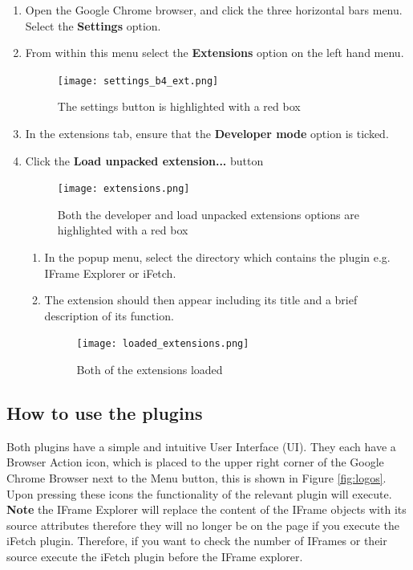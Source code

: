\documentclass[12pt]{article}
\begin{document}
\begin{enumerate}
    \item Open the Google Chrome browser, and click the three horizontal bars menu. Select the \textbf{Settings} option. 
    \item From within this menu select the \textbf{Extensions} option on the left hand menu.
    
    \begin{figure}[H]
        \centering
        \texttt{[image: settings\_b4\_ext.png]}
        \caption{The settings button is highlighted with a red box}
        \label{fig:settings_before_ext}
    \end{figure}

    
    \item In the extensions tab, ensure that the \textbf{Developer mode} option is ticked. 
    \item Click the \textbf{Load unpacked extension...} button
    
    \begin{figure}[H]
        \centering
        \texttt{[image: extensions.png]}
        \caption{Both the developer and load unpacked extensions options are highlighted with a red box}
        \label{fig:extensions}
    \end{figure}
    
    \begin{enumerate}
        \item In the popup menu, select the directory which contains the plugin e.g. IFrame Explorer or iFetch. 
        \item The extension should then appear including its title and a brief description of its function.
        
        \begin{figure}[H]
            \centering
            \texttt{[image: loaded\_extensions.png]}
            \caption{Both of the extensions loaded}
            \label{fig:loaded_extensions}
        \end{figure}
        
    \end{enumerate}
\end{enumerate}

\subsection{How to use the plugins} \label{userGuide}
Both plugins have a simple and intuitive User Interface (UI). They each have a Browser Action icon, which is placed to the upper right corner of the Google Chrome Browser next to the Menu button, this is shown in Figure \ref{fig:logos}. Upon pressing these icons the functionality of the relevant plugin will execute. \textbf{Note} the IFrame Explorer will replace the content of the IFrame objects with its source attributes therefore they will no longer be on the page if you execute the iFetch plugin. Therefore, if you want to check the number of IFrames or their source execute the iFetch plugin before the IFrame explorer.  
\end{document}
